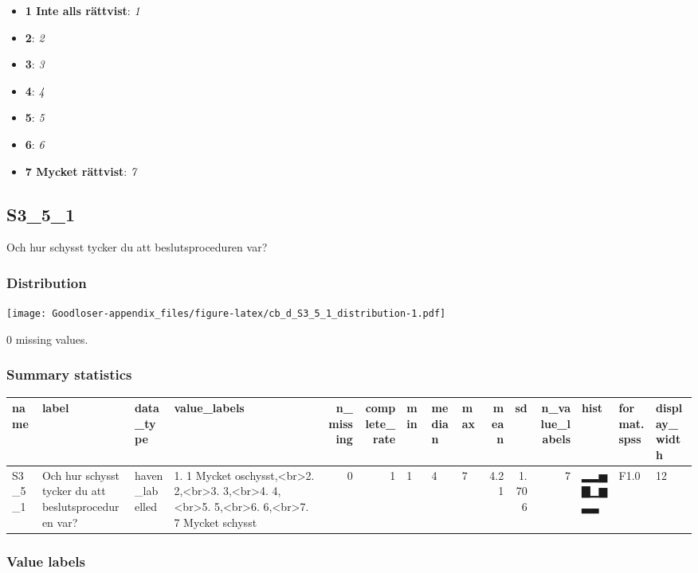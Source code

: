 \documentclass[
]{book}
\providecommand{\tightlist}{%
  \setlength{\itemsep}{0pt}\setlength{\parskip}{0pt}}
\begin{document}
\begin{itemize}
\tightlist
\item
  \textbf{1 Inte alls rättvist}: \emph{1}
\item
  \textbf{2}: \emph{2}
\item
  \textbf{3}: \emph{3}
\item
  \textbf{4}: \emph{4}
\item
  \textbf{5}: \emph{5}
\item
  \textbf{6}: \emph{6}
\item
  \textbf{7 Mycket rättvist}: \emph{7}
\end{itemize}

\hypertarget{S3_5_1}{%
\subsection{S3\_5\_1}\label{S3_5_1}}

Och hur schysst tycker du att beslutsproceduren var?

\hypertarget{S3_5_1_distribution}{%
\subsubsection{Distribution}\label{S3_5_1_distribution}}

\texttt{[image: Goodloser-appendix\_files/figure-latex/cb\_d\_S3\_5\_1\_distribution-1.pdf]}

0 missing values.

\hypertarget{S3_5_1_summary}{%
\subsubsection{Summary statistics}\label{S3_5_1_summary}}

\begin{tabular}{l|l|l|l|r|r|l|l|l|r|r|r|l|l|l}
\hline
name & label & data_type & value_labels & n_missing & complete_rate & min & median & max & mean & sd & n_value_labels & hist & format.spss & display_width\\
\hline
S3_5_1 & Och hur schysst tycker du att beslutsproceduren var? & haven_labelled & 1. 1 Mycket oschysst,<br>2. 2,<br>3. 3,<br>4. 4,<br>5. 5,<br>6. 6,<br>7. 7 Mycket schysst & 0 & 1 & 1 & 4 & 7 & 4.21 & 1.706 & 7 & ▂▂▅▇▁▆▃▃ & F1.0 & 12\\
\hline
\end{tabular}

\hypertarget{S3_5_1_labels}{%
\subsubsection{Value labels}\label{S3_5_1_labels}}
\end{document}
